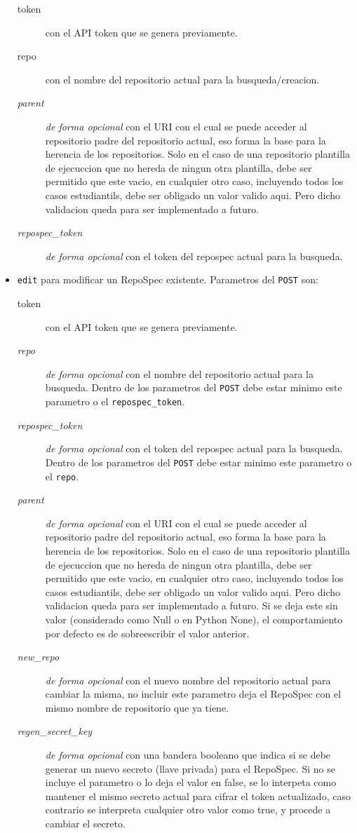 \begin{itemize}
    \begin{description}
    	\item[token] con el API token que se genera previamente.
        \item[repo] con el nombre del repositorio actual para la busqueda/creacion.
        \item[\textit{parent}] \textit{de forma opcional} con el URI con el cual se puede acceder al repositorio padre del repositorio actual, eso forma la base para la herencia de los repositorios. Solo en el caso de una repositorio plantilla de ejecuccion que no hereda de ningun otra plantilla, debe ser permitido que este vacio, en cualquier otro caso, incluyendo todos los casos estudiantils, debe ser obligado un valor valido aqui. Pero dicho validacion queda para ser implementado a futuro.
        \item[\textit{repospec\_token}] \textit{de forma opcional} con el token del repospec actual para la busqueda.
    \end{description}
    \item \texttt{edit} para modificar un RepoSpec existente. Parametros del \texttt{POST} son:
    \begin{description}
    	\item[token] con el API token que se genera previamente.
        \item[\textit{repo}] \textit{de forma opcional} con el nombre del repositorio actual para la busqueda. Dentro de los parametros del \texttt{POST} debe estar minimo este parametro o el \texttt{repospec\_token}.
        \item[\textit{repospec\_token}] \textit{de forma opcional} con el token del repospec actual para la busqueda. Dentro de los parametros del \texttt{POST} debe estar minimo este parametro o el \texttt{repo}.
        \item[\textit{parent}] \textit{de forma opcional} con el URI con el cual se puede acceder al repositorio padre del repositorio actual, eso forma la base para la herencia de los repositorios. Solo en el caso de una repositorio plantilla de ejecuccion que no hereda de ningun otra plantilla, debe ser permitido que este vacio, en cualquier otro caso, incluyendo todos los casos estudiantils, debe ser obligado un valor valido aqui. Pero dicho validacion queda para ser implementado a futuro. Si se deja este sin valor (considerado como Null o en Python None), el comportamiento por defecto es de sobreescribir el valor anterior.
        \item[\textit{new\_repo}] \textit{de forma opcional} con el nuevo nombre del repositorio actual para cambiar la misma, no incluir este parametro deja el RepoSpec con el mismo nombre de repositorio que ya tiene.
        \item[\textit{regen\_secret\_key}] \textit{de forma opcional} con una bandera booleano que indica si se debe generar un nuevo secreto (llave privada) para el RepoSpec. Si no se incluye el parametro o lo deja el valor en false, se lo interpeta como mantener el mismo secreto actual para cifrar el token actualizado, caso contrario se interpreta cualquier otro valor como true, y procede a cambiar el secreto. 
    \end{description}
\end{itemize}
